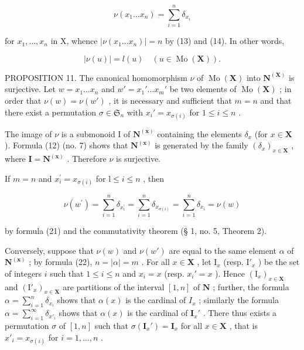 \[
\nu (x _ {1} \dots x _ {n}) = \sum_ {i = 1} ^ {n} \delta_ {x _ {i}}\tag{21}
\]

for \(x_1, \ldots, x_n\) in X, whence \(|\nu(x_1 \ldots x_n)| = n\) by (13) and (14). In other words,

\[
\left| \nu (u) \right| = l (u) \quad (u \in \operatorname{Mo} (\mathbf {X})).\tag{22}
\]

PROPOSITION 11. The canonical homomorphism \(\nu\) of \(\operatorname{Mo}(\mathbf{X})\) into \(\mathbf{N}^{(\mathbf{X})}\) is surjective. Let \(w = x_1 \ldots x_n\) and \(w' = x_1' \ldots x_m'\) be two elements of \(\operatorname{Mo}(\mathbf{X})\) ; in order that \(\nu(w) = \nu(w')\) , it is necessary and sufficient that \(m = n\) and that there exist a permutation \(\sigma \in \mathfrak{S}_n\) with \(x_i' = x_{\sigma(i)}\) for \(1 \leqslant i \leqslant n\) .

The image of \(\nu\) is a submonoid I of \(\mathbf{N}^{(\mathbf{x})}\) containing the elements \(\delta_x\) (for \(x \in \mathbf{X}\) ). Formula (12) (no. 7) shows that \(\mathbf{N}^{(\mathbf{x})}\) is generated by the family \((\delta_x)_{x \in \mathbf{X}}\) , where \(\mathbf{I} = \mathbf{N}^{(\mathbf{x})}\) . Therefore \(\nu\) is surjective.

If \(m = n\) and \(x_{i}^{\prime} = x_{\sigma (i)}\) for \(\mathrm{l}\leqslant i\leqslant n\) , then

\[
\nu (w ^ {\prime}) = \sum_ {i = 1} ^ {n} \delta_ {x _ {i} ^ {\prime}} = \sum_ {i = 1} ^ {n} \delta_ {x _ {\sigma (i)}} = \sum_ {i = 1} ^ {n} \delta_ {x _ {i}} = \nu (w)
\]

by formula (21) and the commutativity theorem (§ 1, no. 5, Theorem 2).

Conversely, suppose that \(\nu(w)\) and \(\nu(w')\) are equal to the same element \(\alpha\) of \(\mathbf{N}^{(\mathbf{x})}\) ; by formula (22), \(n = |\alpha| = m\) . For all \(x \in \mathbf{X}\) , let \(\mathrm{I}_x\) (resp. \(\mathrm{I}'_x\) ) be the set of integers \(i\) such that \(1 \leqslant i \leqslant n\) and \(x_i = x\) (resp. \(x_i' = x\) ). Hence \((\mathrm{I}_x)_{x \in \mathbf{X}}\) and \((\mathrm{I}'_x)_{x \in \mathbf{X}}\) are partitions of the interval \([1, n]\) of \(\mathbf{N}\) ; further, the formula \(\alpha = \sum_{i=1}^{n} \delta_{x_i}\) shows that \(\alpha(x)\) is the cardinal of \(I_x\) ; similarly the formula \(\alpha = \sum_{i=1}^{\infty} \delta_{x'_i}\) shows that \(\alpha(x)\) is the cardinal of \(\mathbf{I}_x'\) . There thus exists a permutation \(\sigma\) of \([1, n]\) such that \(\sigma(\mathbf{I}_x') = \mathbf{I}_x\) for all \(x \in \mathbf{X}\) , that is \(x'_i = x_{\sigma(i)}\) for \(i = 1, \ldots, n\) .

